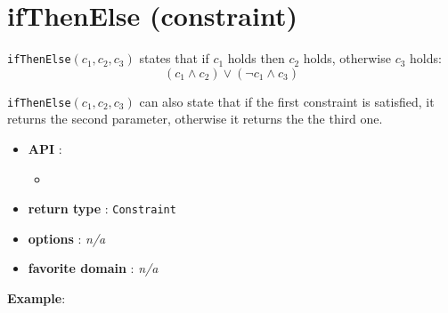 \label{ifthenelse}
\hypertarget{ifthenelse}{}

\section{ifThenElse (constraint)}\label{ifthenelse:ifthenelseconstraint}\hypertarget{ifthenelse:ifthenelseconstraint}{}
\begin{notedef}
  \texttt{ifThenElse}$(c_1,c_2,c_3)$ states that if $c_1$ holds then $c_2$ holds, otherwise $c_3$ holds:
  $$(c_1\land c_2) \lor (\neg c_1 \land c_3)$$
\end{notedef}

\texttt{ifThenElse}$(c_1,c_2,c_3)$ can also state that if the first constraint is satisfied, it returns the second parameter, otherwise it returns the the third one.

\begin{itemize}
	\item \textbf{API} :
	\begin{itemize}
		\item {}
	\end{itemize}
	\item \textbf{return type} : \texttt{Constraint}
	\item \textbf{options} : \emph{n/a}
	\item \textbf{favorite domain} : \emph{n/a}
\end{itemize}

\textbf{Example}:


